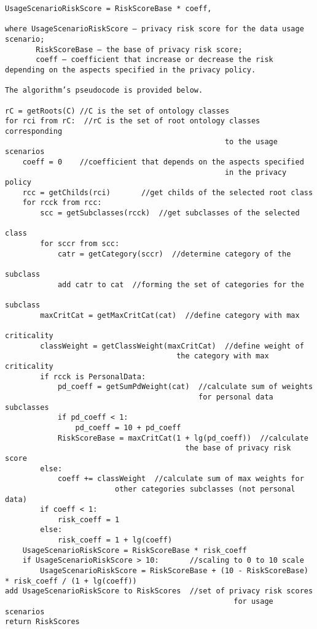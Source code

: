 \documentclass[../main]{subfiles}
\begin{document}
\begin{lstlisting}
UsageScenarioRiskScore = RiskScoreBase * coeff,

where UsageScenarioRiskScore – privacy risk score for the data usage scenario;
       RiskScoreBase – the base of privacy risk score;
       coeff – coefficient that increase or decrease the risk depending on the aspects specified in the privacy policy.

The algorithm’s pseudocode is provided below.

rC = getRoots(C) //C is the set of ontology classes
for rci from rC:  //rC is the set of root ontology classes corresponding 
                                                  to the usage scenarios
    coeff = 0    //coefficient that depends on the aspects specified 
                                                  in the privacy policy
    rcc = getChilds(rci)       //get childs of the selected root class
    for rcck from rcc:
        scc = getSubclasses(rcck)  //get subclasses of the selected 
                                                                  class
        for sccr from scc:
            catr = getCategory(sccr)  //determine category of the 
                                                               subclass
            add catr to cat  //forming the set of categories for the 
                                                               subclass
        maxCritCat = getMaxCritCat(cat)  //define category with max 
                                                            criticality
        classWeight = getClassWeight(maxCritCat)  //define weight of 
                                       the category with max criticality
        if rcck is PersonalData:
            pd_coeff = getSumPdWeight(cat)  //calculate sum of weights 
                                            for personal data subclasses
            if pd_coeff < 1: 
                pd_coeff = 10 + pd_coeff
            RiskScoreBase = maxCritCat(1 + lg(pd_coeff))  //calculate 
                                         the base of privacy risk score
        else:
            coeff += classWeight  //calculate sum of max weights for 
                         other categories subclasses (not personal data)
        if coeff < 1: 
            risk_coeff = 1 
        else:
            risk_coeff = 1 + lg(coeff) 
    UsageScenarioRiskScore = RiskScoreBase * risk_coeff
    if UsageScenarioRiskScore > 10:       //scaling to 0 to 10 scale
        UsageScenarioRiskScore = RiskScoreBase + (10 - RiskScoreBase) * risk_coeff / (1 + lg(coeff)) 
add UsageScenarioRiskScore to RiskScores  //set of privacy risk scores 
                                                    for usage scenarios
return RiskScores
\end{lstlisting}
\end{document}
